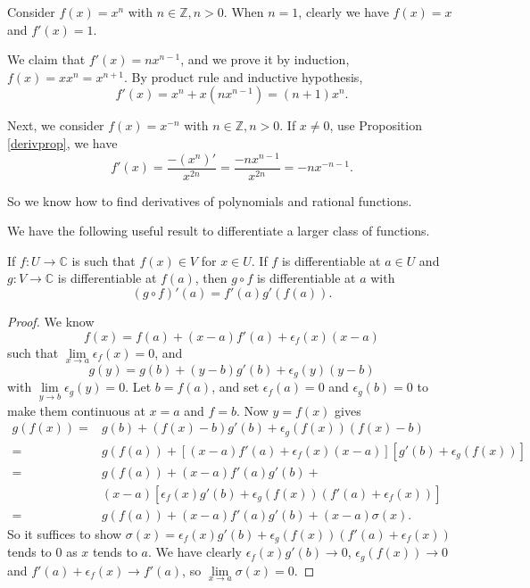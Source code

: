 \begin{example}
    Consider \(f(x) = x^{n}\) with \(n \in \mathbb{Z}, n>0\). When \(n = 1\), clearly we have \(f(x) = x\) and \(f'(x) = 1\).

    We claim that \(f'(x) = nx^{n-1}\), and we prove it by induction, \(f(x) = x x^n = x^{n + 1}\). By product rule and inductive hypothesis,
    \[
        f'(x) = x^n + x(nx^{n-1}) = (n + 1) x^n.
    \]

    Next, we consider \(f(x) = x^{-n}\) with \(n \in \mathbb{Z}, n > 0\). If \(x \neq 0\), use Proposition \eqref{derivprop}, we have
    \[
        f'(x) = \frac{-(x^n)'}{x^{2n}} = \frac{-nx^{n-1}}{x^{2n}} = -n x^{-n -1}.
    \]

    So we know how to find derivatives of polynomials and rational functions.
\end{example}
We have the following useful result to differentiate a larger class of functions.
\begin{theorem}
    If \(f: U \to \mathbb{C}\) is such that \(f(x) \in V\) for \(x \in U\). If \(f\) is differentiable at \(a \in U\) and \(g:V \to \mathbb{C}\) is differentiable at \(f(a)\), then \(g\circ f\) is differentiable at \(a\) with
    \[
        (g\circ f)'(a) = f'(a)g'(f(a)).
    \]
\end{theorem}
\begin{proof}
    We know
    \[
        f(x) = f(a) + (x-a)f'(a) + \epsilon_f(x)(x-a)
    \]
    such that \(\lim\limits_{x \to a} \epsilon_f(x)= 0\), and
    \[
        g(y) = g(b) + (y - b)g'(b) + \epsilon_g(y)(y-b)
    \]
    with \(\lim\limits_{y \to b} \epsilon_g(y) = 0\). Let \(b = f(a)\), and set \(\epsilon_f(a) = 0\) and \(\epsilon_g(b) = 0\) to make them continuous at \(x = a\) and \(f = b\). Now \(y = f(x)\) gives
    \begin{align*}
        g(f(x)) =& g(b) + (f(x) - b)g'(b) + \epsilon_g(f(x))(f(x) - b)\\
        =&g(f(a)) + [(x-a)f'(a) + \epsilon_f(x)(x-a)][g'(b) + \epsilon_g(f(x))]\\
        =& g(f(a)) + (x-a)f'(a)g'(b) +\\
        &(x-a)[\epsilon_f(x)g'(b) + \epsilon_g(f(x))(f'(a) + \epsilon_f(x))]\\
        =& g(f(a)) + (x-a)f'(a)g'(b) + (x-a)\sigma(x).
    \end{align*}
    So it suffices to show \(\sigma(x) = \epsilon_f(x)g'(b) + \epsilon_g(f(x))(f'(a) + \epsilon_f(x))\) tends to 0 as \(x\) tends to \(a\). We have clearly \(\epsilon_f(x)g'(b) \to 0\), \(\epsilon_g(f(x)) \to 0\) and \(f'(a)+\epsilon_f(x) \to f'(a)\), so \(\lim\limits_{x \to a} \sigma(x) = 0\).
\end{proof}
